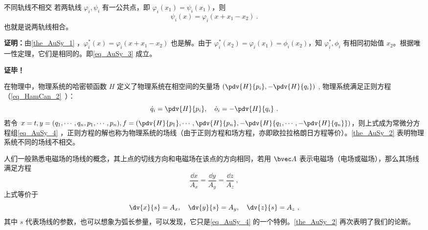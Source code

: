 \begin{theorem}{不同轨线不相交}\label{the_AuSy_2}
若两轨线 $\varphi_i,\psi_i$ 有一公共点，即 $\varphi_i(x_1)=\psi_i(x_1)$，则
\begin{equation}\label{eq_AuSy_3}
\psi_i(x)=\varphi_i(x+x_1-x_2)~.
\end{equation}
也就是说两轨线相合。
\end{theorem}
\textbf{证明：}由\autoref{the_AuSy_1} ，$\varphi^*_i(x)=\varphi_i(x+x_1-x_2)$ 也是解。由于 $\varphi^*_i(x_2)=\varphi_i(x_1)=\phi_i(x_2)$，知 $\varphi^*_i,\phi_i$ 有相同初始值 $x_2$。根据唯一性定理，它们是相同的。即\autoref{eq_AuSy_3} 成立。

\textbf{证毕！}

在物理中，物理系统的哈密顿函数 $H$ 定义了物理系统在相空间的矢量场 $(\pdv{H}{p_i},-\pdv{H}{q_i})$ , 物理系统满足正则方程（\autoref{eq_HamCan_2}~）：
\begin{equation}
\dot q_i=\pdv{H}{p_i},\quad \dot o_i=-\pdv{H}{q_i}~.
\end{equation}
若令 $x=t,y=(q_1,\cdots,q_n,p_1,\cdots,p_n),f=(\pdv{H}{p_1},\cdots,\pdv{H}{p_n},-\pdv{H}{q_1,\cdots,-\pdv{H}{q_n}})$，则上式成为常微分方程组\autoref{eq_AuSy_4} ，正则方程的解也称为物理系统的场线（由于正则方程和场方程，亦即欧拉拉格朗日方程等价）。\autoref{the_AuSy_2} 表明物理系统不同的场线不相交。

人们一般熟悉电磁场的场线的概念，其上点的切线方向和电磁场在该点的方向相同，若用 $\bvec A$ 表示电磁场（电场或磁场），那么其场线满足方程
\begin{equation}
\frac{\dd x}{A_x}=\frac{\dd y}{A_y}=\frac{\dd z}{A_z}~,
\end{equation}
上式等价于
\begin{equation}
\dv{x}{s}=A_x,\quad\dv{y}{s}=A_y,\quad\dv{z}{s}=A_z~,
\end{equation}
其中 $s$ 代表场线的参数，也可以想象为弧长参量，可以发现，它只是\autoref{eq_AuSy_4} 的一个特例。\autoref{the_AuSy_2} 再次表明了我们的论断。

